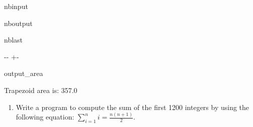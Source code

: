 \documentclass[letterpaper,10pt,english]{sphinxmanual}
\begin{document}
\begin{sphinxuseclass}{nbinput}
{
\begin{sphinxVerbatim}[commandchars=\\\{\}]
\llap{\color{nbsphinxin}[5]:\,\hspace{\fboxrule}\hspace{\fboxsep}}
  
  
  
    
 
\end{sphinxVerbatim}
}

\end{sphinxuseclass}
\begin{sphinxuseclass}{nboutput}
\begin{sphinxuseclass}{nblast}
{

\kern-\sphinxverbatimsmallskipamount\kern-\baselineskip
\kern+\FrameHeightAdjust\kern-\fboxrule
\vspace{\nbsphinxcodecellspacing}

\begin{sphinxuseclass}{output_area}
\begin{sphinxuseclass}{}


\begin{sphinxVerbatim}[commandchars=\\\{\}]
Trapezoid area is:  357.0
\end{sphinxVerbatim}



\end{sphinxuseclass}
\end{sphinxuseclass}
}

\end{sphinxuseclass}
\end{sphinxuseclass}

\begin{enumerate}
%
\setcounter{enumi}{2}
\item {} 
\sphinxAtStartPar
Write a program to compute the sum of the first 1200 integers by using the following equation: \(\sum\limits_{i=1}^n i = \frac{n (n+1)}{2}\).

\end{enumerate}
\end{document}
